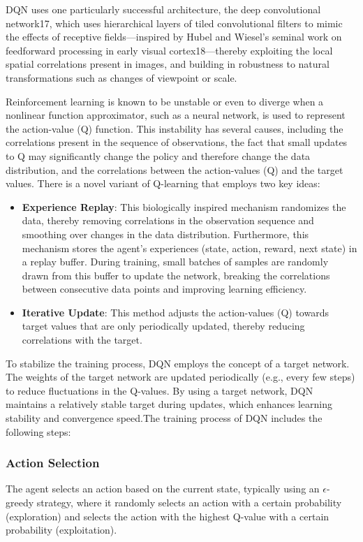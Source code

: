 \documentclass[journal]{IEEEtran}
\begin{document}
DQN uses one particularly successful architecture, the deep convolutional network17, which uses hierarchical layers of tiled convolutional filters to mimic the effects of receptive fields—inspired by Hubel and Wiesel’s seminal work on feedforward processing in early visual cortex18—thereby exploiting the local spatial correlations present in images, and building in robustness to natural transformations such as changes of viewpoint or scale.

Reinforcement learning is known to be unstable or even to diverge when a nonlinear function approximator, such as a neural network, is used to represent the action-value (Q) function. This instability has several causes, including the correlations present in the sequence of observations, the fact that small updates to Q may significantly change the policy and therefore change the data distribution, and the correlations between the action-values (Q) and the target values. There is a novel variant of Q-learning that employs two key ideas:

\begin{itemize}
\item \textbf{Experience Replay}: This biologically inspired mechanism randomizes the data, thereby removing correlations in the observation sequence and smoothing over changes in the data distribution. Furthermore, this mechanism stores the agent's experiences (state, action, reward, next state) in a replay buffer. During training, small batches of samples are randomly drawn from this buffer to update the network, breaking the correlations between consecutive data points and improving learning efficiency.
\item \textbf{Iterative Update}: This method adjusts the action-values (Q) towards target values that are only periodically updated, thereby reducing correlations with the target. 
\end{itemize}

To stabilize the training process, DQN employs the concept of a target network. The weights of the target network are updated periodically (e.g., every few steps) to reduce fluctuations in the Q-values. By using a target network, DQN maintains a relatively stable target during updates, which enhances learning stability and convergence speed.The training process of DQN includes the following steps:

\subsubsection{Action Selection}The agent selects an action based on the current state, typically using an $\epsilon$-greedy strategy, where it randomly selects an action with a certain probability (exploration) and selects the action with the highest Q-value with a certain probability (exploitation).
\end{document}
